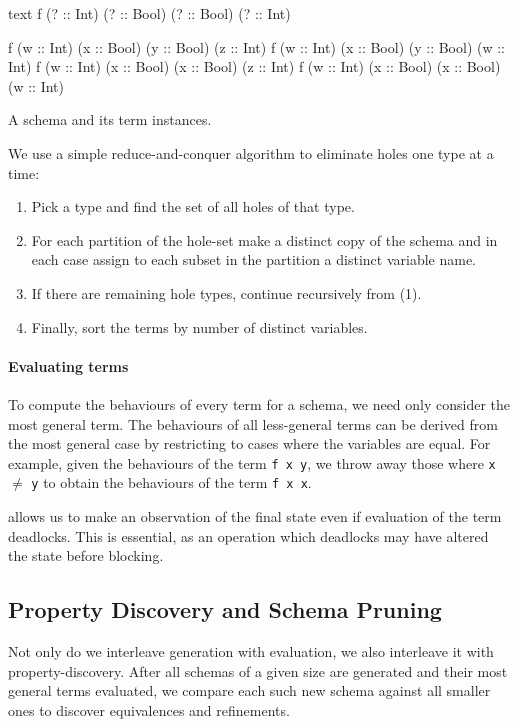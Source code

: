 \begin{listing}
\centering
\begin{cminted}{text}
f (? :: Int) (? :: Bool) (? :: Bool) (? :: Int)

f (w :: Int) (x :: Bool) (y :: Bool) (z :: Int)
f (w :: Int) (x :: Bool) (y :: Bool) (w :: Int)
f (w :: Int) (x :: Bool) (x :: Bool) (z :: Int)
f (w :: Int) (x :: Bool) (x :: Bool) (w :: Int)
\end{cminted}
\caption{A schema and its term instances.}\label{lst:schematerms}
\end{listing}

We use a simple reduce-and-conquer algorithm to eliminate holes one
type at a time:

\begin{enumerate}
\item Pick a type and find the set of all holes of that type.
\item For each partition of the hole-set make a distinct copy of the
  schema and in each case assign to each subset in the partition a
  distinct variable name.
\item If there are remaining hole types, continue recursively from
  (1).
\item Finally, sort the terms by number of distinct variables.
\end{enumerate}

\paragraph{Evaluating terms}
To compute the behaviours of every term for a schema, we need only
consider the most general term.  The behaviours of all less-general
terms can be derived from the most general case by restricting to
cases where the variables are equal.  For example, given the
behaviours of the term \verb|f x y|, we throw away those where
\verb|x| $\neq$ \verb|y| to obtain the behaviours of the term
\verb|f x x|.

\dejafu{} allows us to make an observation of the final state even if
evaluation of the term deadlocks.  This is essential, as an operation
which deadlocks may have altered the state before blocking.

\subsection{Property Discovery and Schema Pruning}
\label{sec:coco-hiw-prune}

Not only do we interleave generation with evaluation, we also
interleave it with property-discovery.  After all schemas of a given
size are generated and their most general terms evaluated, we compare
each such new schema against all smaller ones to discover equivalences
and refinements.


